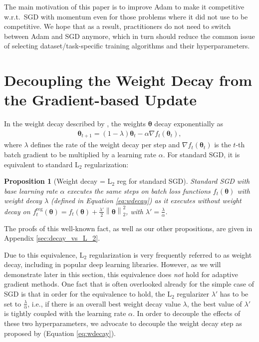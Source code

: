 \documentclass[usenames,dvipsnames]{article}
\newcommand{\norm}[1]{\left\lVert#1\right\rVert}
\newtheorem{prop}{Proposition}
\begin{document}
The main motivation of this paper is to improve Adam 
to make it competitive w.r.t.\ SGD with momentum even for those problems where it did not use to be competitive. 
We hope that as a result, practitioners do not need to switch between Adam and SGD anymore, which in turn should reduce the common issue of selecting dataset/task-specific training algorithms and their hyperparameters. 


\newcommand{\adamcolor}{Thistle}
\newcommand{\ouradamcolor}{SpringGreen}
\newcommand{\adam}[1]{\colorbox{\adamcolor}{$\displaystyle #1$}}
\newcommand{\adamtext}[1]{\colorbox{\adamcolor}{#1}}
\newcommand{\ouradam}[1]{\colorbox{\ouradamcolor}{$\displaystyle #1$}}
\newcommand{\ouradamtext}[1]{\colorbox{\ouradamcolor}{#1}}

\section{Decoupling the Weight Decay from the Gradient-based Update}
\label{sec:decoupling}

In the weight decay described by \citet{hanson1988comparing}, the weights $\bm{\theta}$  decay exponentially as 
\begin{eqnarray}
	\bm{\theta}_{t+1} = (1 - \lambda) \bm{\theta}_t - \alpha \nabla f_t(\bm{\theta}_t), \label{eq:wdecay}
\end{eqnarray}
where $\lambda$ defines the rate of the weight decay per step and $\nabla f_t(\bm{\theta}_t)$ is the $t$-th batch gradient to be multiplied by a learning rate $\alpha$.
For standard SGD, 
it is equivalent to standard L$_2$ regularization: 
\begin{prop}[Weight decay = L$_2$ reg for standard SGD]
Standard SGD with base learning rate $\alpha$ executes the same steps on batch loss functions $f_t(\bm{\theta})$ with weight decay $\lambda$ (defined in Equation \ref{eq:wdecay}) as it executes without weight decay on $f_{t}^{\text{reg}}(\bm{\theta}) = f_t(\bm{\theta}) + \frac{\lambda'}{2} \norm{\bm{\theta}}_2^2$, with $\lambda' = \frac{\lambda}{\alpha}$.
\end{prop}
The proofs of this well-known fact, as well as our other propositions, are given in Appendix \ref{sec:decay_vs_L_2}.

Due to this equivalence, L$_2$ regularization is very frequently referred to as weight decay, including in popular deep learning libraries. However, as we will demonstrate later in this section, this equivalence does \emph{not} hold for adaptive gradient methods. 
One fact that is often overlooked already for the simple case of SGD is that in order for the equivalence to hold, the L$_2$ regularizer $\lambda'$ has to be set to $\frac{\lambda}{\alpha}$, i.e., if there is an overall best weight decay value $\lambda$, the best value of $\lambda'$ is tightly coupled with the learning rate $\alpha$. 
In order to decouple the effects of these two hyperparameters, we advocate to decouple the weight decay step as proposed by \citet{hanson1988comparing} (Equation \ref{eq:wdecay}).
\end{document}
